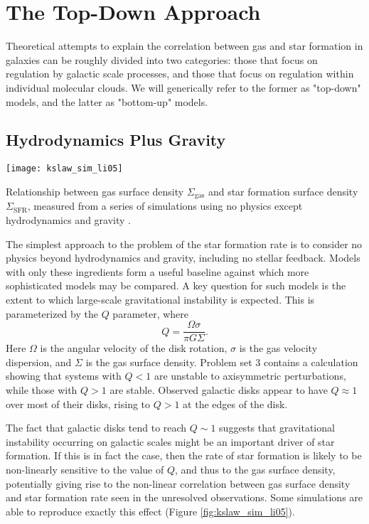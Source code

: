 \section{The Top-Down Approach}

Theoretical attempts to explain the correlation between gas and star formation in galaxies can be roughly divided into two categories: those that focus on regulation by galactic scale processes, and those that focus on regulation within individual molecular clouds. We will generically refer to the former as "top-down" models, and the latter as "bottom-up" models.

\subsection{Hydrodynamics Plus Gravity}

\begin{marginfigure}
\texttt{[image: kslaw\_sim\_li05]}
\caption[Kennicutt-Schmidt relation from simulations with only gravity and hydrodynamics]{
\label{fig:kslaw_sim_li05}
Relationship between gas surface density $\Sigma_{\mathrm{gas}}$ and star formation surface density $\Sigma_{\mathrm{SFR}}$, measured from a series of simulations using no physics except hydrodynamics and gravity \citep{li05a}.
}
\end{marginfigure}

The simplest approach to the problem of the star formation rate is to consider no physics beyond hydrodynamics and gravity, including no stellar feedback. Models with only these ingredients form a useful baseline against which more sophisticated models may be compared. A key question for such models is the extent to which large-scale gravitational instability is expected. This is parameterized by the \citet{toomre64a} $Q$ parameter, where
\begin{equation}
Q = \frac{\Omega \sigma}{\pi G \Sigma}.
\end{equation}
Here $\Omega$ is the angular velocity of the disk rotation, $\sigma$ is the gas velocity dispersion, and $\Sigma$ is the gas surface density. Problem set 3 contains a calculation showing that systems with $Q < 1$ are unstable to axisymmetric perturbations, while those with $Q>1$ are stable. Observed galactic disks appear to have $Q \approx 1$ over most of their disks, rising to $Q > 1$ at the edges of the disk.

The fact that galactic disks tend to reach $Q \sim 1$ suggests that gravitational instability occurring on galactic scales might be an important driver of star formation. If this is in fact the case, then the rate of star formation is likely to be non-linearly sensitive to the value of $Q$, and thus to the gas surface density, potentially giving rise to the non-linear correlation between gas surface density and star formation rate seen in the unresolved observations. Some simulations are able to reproduce exactly this effect (Figure \ref{fig:kslaw_sim_li05}).

